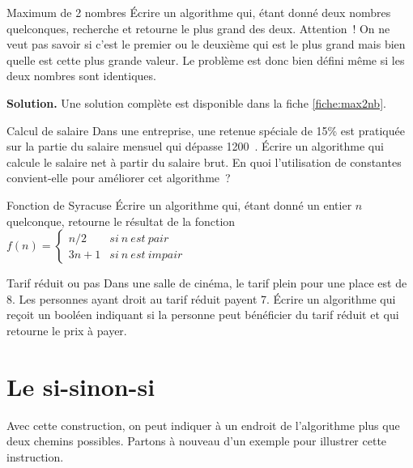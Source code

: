 	\begin{Exercice}{Maximum de 2 nombres}
		Écrire un algorithme qui, étant donné deux nombres quelconques,
		recherche et retourne le plus grand des deux. Attention~! On ne veut
		pas savoir si c’est le premier ou le deuxième qui est
		le plus grand mais bien quelle est cette plus grande valeur. Le
		problème est donc bien défini même si les deux nombres sont
		identiques.
		
		\textbf{Solution.}
		Une solution complète est disponible dans la fiche \vref{fiche:max2nb}.
	\end{Exercice}
	
	\begin{Exercice}{Calcul de salaire}
		Dans une entreprise, 
		une retenue spéciale de 15\% est pratiquée 
		sur la partie du salaire mensuel qui dépasse 1200~\texteuro. 
		Écrire un algorithme qui calcule le salaire net à partir du salaire brut. 
		En quoi l’utilisation de constantes convient-elle pour améliorer cet algorithme~?
	\end{Exercice}

	\begin{Exercice}{Fonction de Syracuse}
		Écrire un algorithme qui, étant donné un entier $n$ quelconque,
		retourne le résultat de la fonction
		$f(n)=
			\left\{
			\begin{array}{rl}
				n/2 & si \ n \ est\ pair\\
				3n+1 & si \ n \ est \ impair
			\end{array}
			\right.$
	\end{Exercice}

	\begin{Exercice}{Tarif réduit ou pas}
		Dans une salle de cinéma,
		le tarif plein pour une place est de 8\texteuro{}.
		Les personnes ayant droit au tarif réduit payent 7\texteuro{}.
		Écrire un algorithme qui reçoit un booléen
		indiquant si la personne peut bénéficier du tarif réduit
		et qui retourne le prix à payer.
	\end{Exercice}

\section{Le si-sinon-si}

	Avec cette construction,
	on peut indiquer à un endroit de l'algorithme
	plus que deux chemins possibles.
	Partons à nouveau d'un exemple pour illustrer cette instruction.
	
